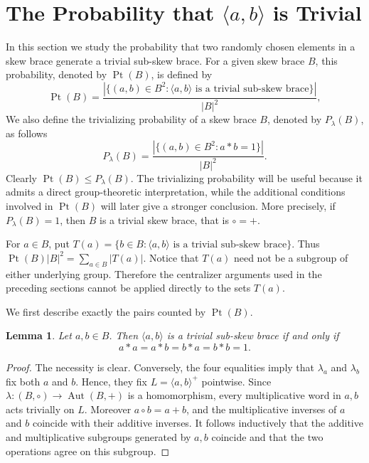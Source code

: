 \documentclass[10pt,a4paper]{amsart}
\numberwithin{equation}{section}
\newtheorem{lem}[equation]{Lemma}
\newcommand{\Pt}{\operatorname{Pt} }
\newcommand{\Aut}{\operatorname{Aut} }
\begin{document}



\section{The Probability that $\langle a,b\rangle$ is Trivial}

In this section we study the probability that two randomly chosen elements in a skew brace generate a trivial sub-skew brace. For a given skew brace $B$, this probability, denoted by $\Pt(B)$, is defined by
$$
\Pt(B)=\frac{|\{(a,b)\in B^2:\langle a,b\rangle\text{ is a trivial sub-skew brace}\}|}{|B|^2},
$$
We also define the trivializing  probability of a skew brace $B$, denoted by $P_{\lambda}(B)$, as follows 
$$
P_{\lambda}(B)=\frac{|\{(a,b)\in B^2:a*b= 1\}|}{|B|^2}.
$$
Clearly $\Pt(B)\leqslant P_{\lambda}(B)$. The  trivializing probability will be useful because it admits a direct group-theoretic interpretation, while
the additional conditions involved in $\Pt(B)$ will later give a stronger
conclusion. More precisely, if $P_{\lambda}(B)=1$, then $B$ is a trivial skew brace, that is $\circ = +$.

For $a\in B$, put
$T(a)=\{b\in B:\langle a,b\rangle\text{ is a trivial sub-skew brace}\}$. Thus
$\Pt(B)|B|^2=\sum_{a\in B}|T(a)|$. Notice that $T(a)$ need not be a
subgroup of either underlying group. Therefore the centralizer arguments
used in the preceding sections cannot be applied directly to the sets
$T(a)$.

We first describe exactly the pairs counted by $\Pt(B)$.

\begin{lem}\label{lem:two-generated-trivial}
Let $a,b\in B$. Then $\langle a,b\rangle$ is a trivial sub-skew brace if and only if
$$
a*a=a*b=b*a=b*b= 1.
$$
\end{lem}

\begin{proof}
The necessity is clear. Conversely, the four equalities imply that
$\lambda_a$ and $\lambda_b$ fix both $a$ and $b$. Hence, they fix $L=\langle a,b\rangle^+$ pointwise. Since
$\lambda:(B,\circ)\to\Aut(B,+)$ is a homomorphism, every multiplicative
word in $a,b$ acts trivially on $L$. Moreover $a\circ b=a+b$, and the
multiplicative inverses of $a$ and $b$ coincide with their additive
inverses. It follows inductively that the additive and multiplicative
subgroups generated by $a,b$ coincide and that the two operations agree
on this subgroup.
\end{proof}
\end{document}
